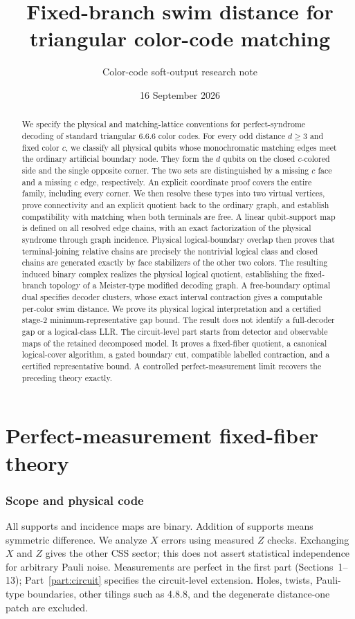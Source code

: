 \documentclass[11pt]{article}
\title{Fixed-branch swim distance for triangular color-code matching}
\author{Color-code soft-output research note}
\date{16 September 2026}
\theoremstyle{definition}
\theoremstyle{plain}
\theoremstyle{remark}
\begin{document}
\maketitle
\begin{abstract}
We specify the physical and matching-lattice conventions for perfect-syndrome
decoding of standard triangular 6.6.6 color codes. For every odd distance
$d\geq3$ and fixed color $c$, we classify all physical qubits whose
monochromatic matching edges meet the ordinary artificial boundary node.
They form the $d$ qubits on the closed $c$-colored side and the single
opposite corner. The two sets are distinguished by a missing $c$ face and a
missing $c$ edge, respectively. An explicit coordinate proof covers the
entire family, including every corner. We then resolve these types
into two virtual vertices, prove connectivity and an explicit quotient
back to the ordinary graph, and establish compatibility with matching
when both terminals are free. A linear qubit-support map is defined on
all resolved edge chains, with an exact factorization of the physical
syndrome through graph incidence. Physical logical-boundary overlap then
proves that terminal-joining relative chains are precisely the nontrivial
logical class and closed chains are generated exactly by face stabilizers of the other
two colors. The resulting induced binary complex realizes the
physical logical quotient, establishing the fixed-branch topology of a
Meister-type modified decoding graph. A free-boundary optimal dual
specifies decoder clusters, whose exact interval contraction gives a
computable per-color swim distance. We prove its physical logical
interpretation and a certified stage-2 minimum-representative gap bound.
The result does not identify a full-decoder gap or a logical-class LLR.
The circuit-level part starts from detector and observable maps of the
retained decomposed model. It proves a fixed-fiber quotient, a canonical
logical-cover algorithm, a gated boundary cut, compatible labelled
contraction, and a certified representative bound. A controlled
perfect-measurement limit recovers the preceding theory exactly.
\end{abstract}

\part{Perfect-measurement fixed-fiber theory}
\section{Scope and physical code}\label{sec:physical}
All supports and incidence maps are binary. Addition of supports means
symmetric difference. We analyze $X$ errors using measured $Z$ checks.
Exchanging $X$ and $Z$ gives the other CSS sector; this does not assert
statistical independence for arbitrary Pauli noise. Measurements are
perfect in the first part (Sections~1--13); Part~\ref{part:circuit}
specifies the circuit-level extension. Holes, twists, Pauli-type boundaries, other tilings such as
4.8.8, and the degenerate distance-one patch are excluded.
\end{document}
